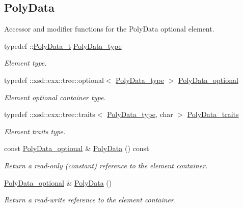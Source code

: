 \subsection*{Poly\+Data}
\label{_amgrpf4abb74983d657d0185d4dd07cff9b2c}%
Accessor and modifier functions for the Poly\+Data optional element. \begin{DoxyCompactItemize}
\item 
typedef \+::\hyperlink{classPolyData__t}{Poly\+Data\+\_\+t} \hyperlink{classVTKFile__t_a4588b4f0e28ba09aa219bda7e1fc6c97}{Poly\+Data\+\_\+type}
\begin{DoxyCompactList}\small\item\em Element type. \end{DoxyCompactList}\item 
typedef \+::xsd\+::cxx\+::tree\+::optional$<$ \hyperlink{classVTKFile__t_a4588b4f0e28ba09aa219bda7e1fc6c97}{Poly\+Data\+\_\+type} $>$ \hyperlink{classVTKFile__t_aacb796775ae228cd61726a23b809f3e4}{Poly\+Data\+\_\+optional}
\begin{DoxyCompactList}\small\item\em Element optional container type. \end{DoxyCompactList}\item 
typedef \+::xsd\+::cxx\+::tree\+::traits$<$ \hyperlink{classVTKFile__t_a4588b4f0e28ba09aa219bda7e1fc6c97}{Poly\+Data\+\_\+type}, char $>$ \hyperlink{classVTKFile__t_aa5ad98f5709c1e9beec3804a7f42b5f6}{Poly\+Data\+\_\+traits}
\begin{DoxyCompactList}\small\item\em Element traits type. \end{DoxyCompactList}\item 
const \hyperlink{classVTKFile__t_aacb796775ae228cd61726a23b809f3e4}{Poly\+Data\+\_\+optional} \& \hyperlink{classVTKFile__t_a7d728d7f31157fc80117c2f80978344c}{Poly\+Data} () const 
\begin{DoxyCompactList}\small\item\em Return a read-\/only (constant) reference to the element container. \end{DoxyCompactList}\item 
\hyperlink{classVTKFile__t_aacb796775ae228cd61726a23b809f3e4}{Poly\+Data\+\_\+optional} \& \hyperlink{classVTKFile__t_a0f87118c1898bc43619fa0bade52e921}{Poly\+Data} ()
\begin{DoxyCompactList}\small\item\em Return a read-\/write reference to the element container. \end{DoxyCompactList}\item 

\end{DoxyCompactItemize}
